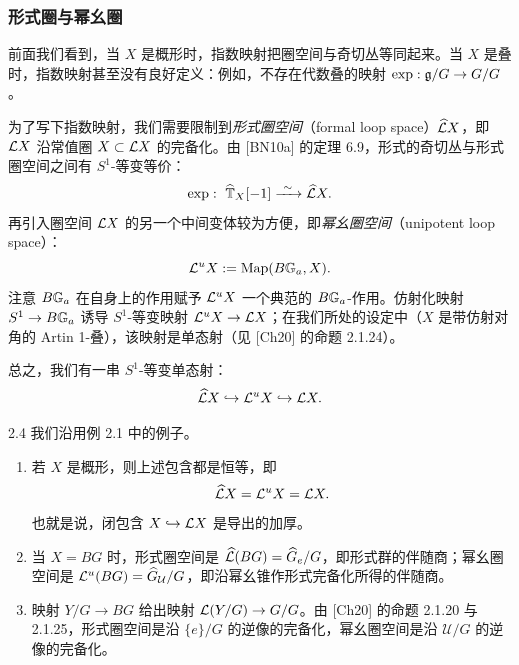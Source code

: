 
\subsubsection{形式圈与幂幺圈}
前面我们看到，当 $X$ 是概形时，指数映射把圈空间与奇切丛等同起来。当 $X$ 是叠时，指数映射甚至没有良好定义：例如，不存在代数叠的映射 $\exp:\mathfrak{g}/G\to G/G$。

为了写下指数映射，我们需要限制到\emph{形式圈空间}（formal loop space）$\widehat{\mathcal{L}} X$，即 $\mathcal{L} X$ 沿常值圈 $X\subset\mathcal{L} X$ 的完备化。由 [BN10a] 的定理 6.9，形式的奇切丛与形式圈空间之间有 $S^1$-等变等价：
\[
\exp:\ \wh{\mathbb T}_X[-1]\xrightarrow{\ \sim\ }\wh\LL X.
\]
再引入圈空间 $\mathcal{L} X$ 的另一个中间变体较为方便，即\emph{幂幺圈空间}（unipotent loop space）：
\[
\mathcal{L}^uX:=\operatorname{Map}(B\mathbb{G}_a,X).
\]
注意 $B\mathbb{G}_a$ 在自身上的作用赋予 $\mathcal{L}^uX$ 一个典范的 $B\mathbb{G}_a$-作用。仿射化映射 $S^1\to B\mathbb{G}_a$ 诱导 $S^1$-等变映射 $\mathcal{L}^uX\to\mathcal{L} X$；在我们所处的设定中（$X$ 是带仿射对角的 Artin 1-叠），该映射是单态射（见 [Ch20] 的命题 2.1.24）。

总之，我们有一串 $S^1$-等变单态射：
\[
\widehat{\mathcal{L}} X\hookrightarrow\mathcal{L}^uX\hookrightarrow\mathcal{L} X.
\]

\begin{exam}{2.4}
我们沿用例 2.1 中的例子。

\begin{enumerate}[label=(\arabic*),leftmargin=2.6em,itemsep=0.2em]
\item 若 $X$ 是概形，则上述包含都是恒等，即
\[
\widehat{\mathcal{L}} X=\mathcal{L}^uX=\mathcal{L} X.
\]
也就是说，闭包含 $X\hookrightarrow\mathcal{L} X$ 是导出的加厚。

\item 当 $X=BG$ 时，形式圈空间是 $\widehat{\mathcal{L}}(BG)=\widehat G_e/G$，即形式群的伴随商；幂幺圈空间是 $\mathcal{L}^u(BG)=\widehat G_{\mathcal U}/G$，即沿幂幺锥作形式完备化所得的伴随商。

\item 映射 $Y/G\to BG$ 给出映射 $\mathcal{L}(Y/G)\to G/G$。由 [Ch20] 的命题 2.1.20 与 2.1.25，形式圈空间是沿 $\{e\}/G$ 的逆像的完备化，幂幺圈空间是沿 $\mathcal U/G$ 的逆像的完备化。
\end{enumerate}
\end{exam}

